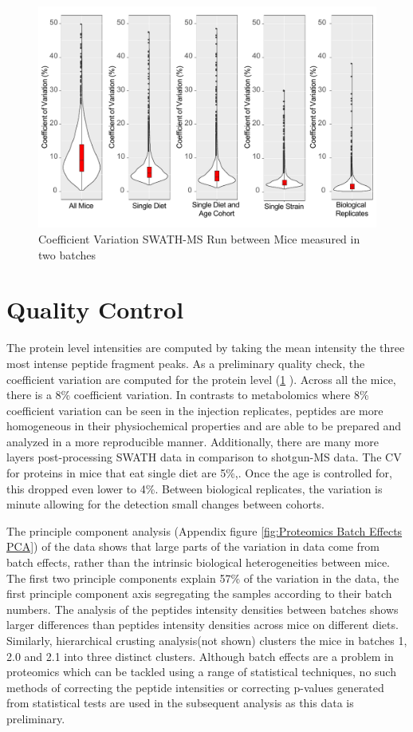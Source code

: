 \documentclass[a4paper]{book}
\begin{document}
	\begin{figure}[htb!]
		\includegraphics[width=\linewidth]{3.Proteomics/protein_cvs_figure.pdf}
		\caption{Coefficient Variation SWATH-MS Run between Mice measured in two batches}
		\label{CV Analysis Proteomic Data}
	\end{figure}
	
	\section{Quality Control}
		
	The protein level intensities are computed by taking the mean intensity the three most intense peptide fragment peaks. As a preliminary quality check, the coefficient variation are computed for the protein level (\ref{CV Analysis Proteomic Data} ). Across all the mice, there is a 8\% coefficient variation. In contrasts to metabolomics where 8\% coefficient variation can be seen in the injection replicates, peptides are more homogeneous in their physiochemical properties and are able to be prepared and analyzed in a more reproducible manner. Additionally, there are many more layers post-processing SWATH data in comparison to shotgun-MS data. The CV for  proteins in mice that eat single diet are 5\%,. Once the age is controlled for, this dropped even lower to 4\%. Between biological replicates, the variation is minute allowing for the detection small changes between cohorts.
	
	The principle component analysis (Appendix figure \ref{fig:Proteomics Batch Effects PCA}) of the data shows that large parts of the variation in data come from batch effects, rather than the intrinsic biological heterogeneities between mice. The first two principle components explain 57\% of the variation in the data, the first principle component axis segregating the samples according to their batch numbers. The analysis of the peptides intensity densities between batches shows larger differences than peptides intensity densities across mice on different diets. Similarly, hierarchical crusting analysis(not shown) clusters the mice in batches 1, 2.0 and 2.1 into three distinct clusters. Although batch effects are a problem in proteomics which can be tackled using a range of statistical techniques\citep{Leek2010TacklingBatchEffects}, no such methods of correcting the peptide intensities or correcting p-values generated from statistical tests are used in the subsequent analysis as this data is preliminary.
		
\end{document}
